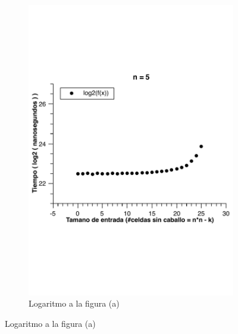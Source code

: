 \begin{figure}[H]
\begin{subfigure}[b]{0.5\textwidth}
                \includegraphics[width=\textwidth]{imagenes/grafico3-n-5-log.pdf}
                \caption{Logaritmo a la figura (a)}
        \end{subfigure}
        

\end{figure}
